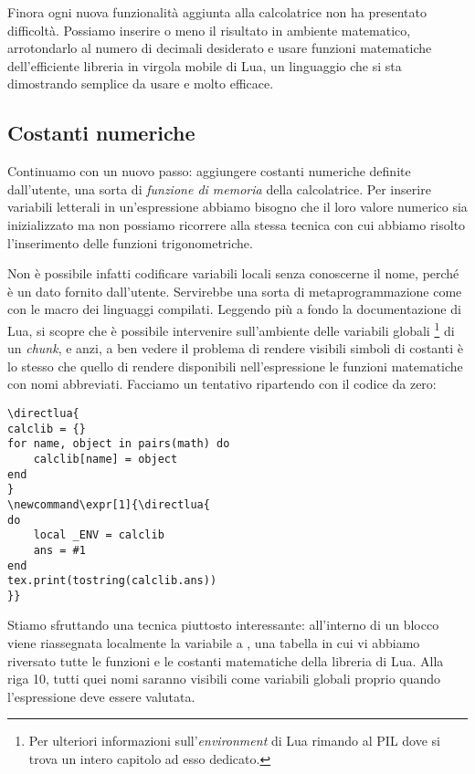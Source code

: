Finora ogni nuova funzionalità aggiunta alla calcolatrice non ha presentato
difficoltà. Possiamo inserire o meno il risultato in ambiente matematico,
arrotondarlo al numero di decimali desiderato e usare funzioni matematiche
dell'efficiente libreria in virgola mobile di Lua, un linguaggio che si sta
dimostrando semplice da usare e molto efficace.


\subsection{Costanti numeriche}

Continuamo con un nuovo passo: aggiungere costanti numeriche definite
dall'utente, una sorta di \emph{funzione di memoria} della calcolatrice. Per
inserire variabili letterali in un'espressione abbiamo bisogno che il loro
valore numerico sia inizializzato ma non possiamo ricorrere alla stessa tecnica
con cui abbiamo risolto l'inserimento delle funzioni trigonometriche.

Non è possibile infatti codificare variabili locali senza conoscerne il nome,
perché è un dato fornito dall'utente. Servirebbe una sorta di metaprogrammazione
come con le macro dei linguaggi compilati. Leggendo più a fondo la
documentazione di Lua, si scopre che è possibile intervenire sull'ambiente delle
variabili globali \footnote{Per ulteriori informazioni
sull'\emph{environment} di Lua rimando al PIL dove si trova un intero capitolo
ad esso dedicato.} di un \emph{chunk}, e anzi, a ben vedere il problema di
rendere visibili simboli di costanti è lo stesso che quello di rendere
disponibili nell'espressione le funzioni matematiche con nomi abbreviati.
Facciamo un tentativo ripartendo con il codice da zero:

%
%
\begin{Verbatim}
\directlua{
calclib = {}
for name, object in pairs(math) do
    calclib[name] = object
end
}
\newcommand\expr[1]{\directlua{
do
    local _ENV = calclib
    ans = #1
end
tex.print(tostring(calclib.ans))
}}
\end{Verbatim}

Stiamo sfruttando una tecnica piuttosto interessante: all'interno di un blocco
viene riassegnata localmente la variabile  a , una
tabella in cui vi abbiamo riversato tutte le funzioni e le costanti matematiche
della libreria  di Lua. Alla riga 10, tutti quei nomi saranno
visibili come variabili globali proprio quando l'espressione deve essere
valutata.


